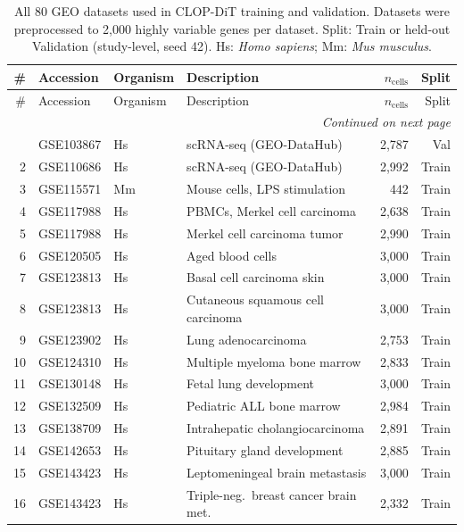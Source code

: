 {\footnotesize
\renewcommand{\arraystretch}{0.9}
\begin{longtable}{rllp{4.2cm}rr}
\caption{All 80 GEO datasets used in CLOP-DiT training and validation. Datasets were preprocessed to 2,000 highly variable genes per dataset. Split: Train or held-out Validation (study-level, seed 42). Hs: \textit{Homo sapiens}; Mm: \textit{Mus musculus}.\label{tab:s1_datasets}} \\
\toprule
\# & Accession & Organism & Description & $n_{\text{cells}}$ & Split \\
\midrule
\endfirsthead
\toprule
\# & Accession & Organism & Description & $n_{\text{cells}}$ & Split \\
\midrule
\endhead
\midrule
\multicolumn{6}{r}{\textit{Continued on next page}} \\
\endfoot
\bottomrule
\endlastfoot
  1 & GSE103867 & Hs & scRNA-seq (GEO-DataHub) & 2,787 & Val \\
  2 & GSE110686 & Hs & scRNA-seq (GEO-DataHub) & 2,992 & Train \\
  3 & GSE115571 & Mm & Mouse cells, LPS stimulation & 442 & Train \\
  4 & GSE117988 & Hs & PBMCs, Merkel cell carcinoma & 2,638 & Train \\
  5 & GSE117988 & Hs & Merkel cell carcinoma tumor & 2,990 & Train \\
  6 & GSE120505 & Hs & Aged blood cells & 3,000 & Train \\
  7 & GSE123813 & Hs & Basal cell carcinoma skin & 3,000 & Train \\
  8 & GSE123813 & Hs & Cutaneous squamous cell carcinoma & 3,000 & Train \\
  9 & GSE123902 & Hs & Lung adenocarcinoma & 2,753 & Train \\
  10 & GSE124310 & Hs & Multiple myeloma bone marrow & 2,833 & Train \\
  11 & GSE130148 & Hs & Fetal lung development & 3,000 & Train \\
  12 & GSE132509 & Hs & Pediatric ALL bone marrow & 2,984 & Train \\
  13 & GSE138709 & Hs & Intrahepatic cholangiocarcinoma & 2,891 & Train \\
  14 & GSE142653 & Hs & Pituitary gland development & 2,885 & Train \\
  15 & GSE143423 & Hs & Leptomeningeal brain metastasis & 3,000 & Train \\
  16 & GSE143423 & Hs & Triple-neg.\ breast cancer brain met. & 2,332 & Train \\

\end{longtable}}

